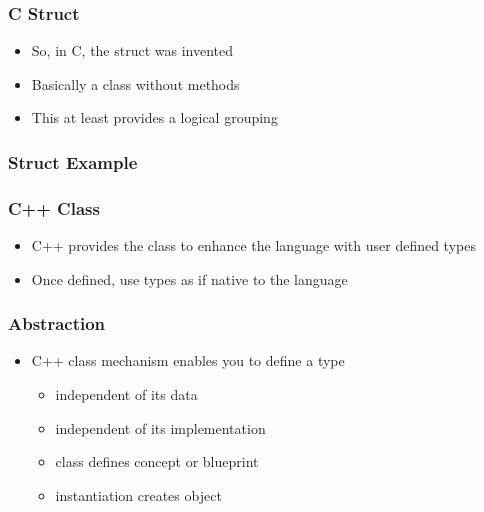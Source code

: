 \subsubsection{C Struct}\label{c-struct}

\begin{itemize}
\itemsep1pt\parskip0pt
\item
  So, in C, the struct was invented
\item
  Basically a class without methods
\item
  This at least provides a logical grouping
\end{itemize}

\subsubsection{Struct Example}\label{struct-example}

\begin{Shaded}
\begin{Highlighting}[]

 
   
   
\NormalTok{\};}

  
\NormalTok{\{}
   \NormalTok{<}
\NormalTok{\}}
\end{Highlighting}
\end{Shaded}

\subsubsection{C++ Class}\label{c-class}

\begin{itemize}
\itemsep1pt\parskip0pt
\item
  C++ provides the class to enhance the language with user defined types
\item
  Once defined, use types as if native to the language
\end{itemize}

\subsubsection{Abstraction}\label{abstraction}

\begin{itemize}
\itemsep1pt\parskip0pt
\item
  C++ class mechanism enables you to define a type

  \begin{itemize}
  \itemsep1pt\parskip0pt
  \item
    independent of its data
  \item
    independent of its implementation
  \item
    class defines concept or blueprint
  \item
    instantiation creates object
  \end{itemize}
\end{itemize}

